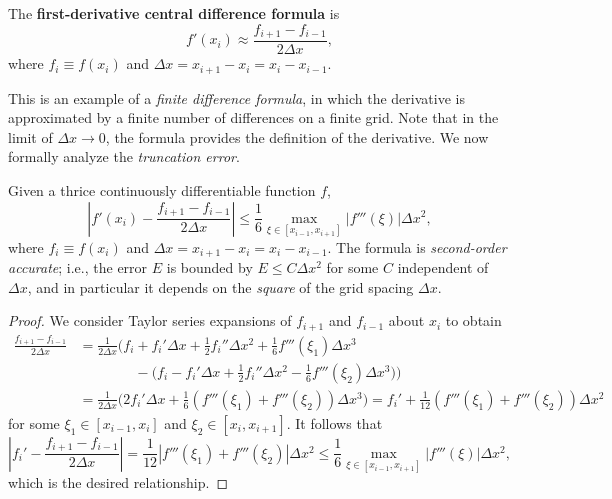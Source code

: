 \begin{definition}
    The \textbf{first-derivative central difference formula} is
    \begin{equation*}
        f'(x_i) \approx \frac{f_{i+1} - f_{i-1}}{2\Delta x}, \tag{8.1}
    \end{equation*}
    where $f_i \equiv f(x_i)$ and $\Delta x = x_{i+1} - x_i = x_i - x_{i-1}$.
\end{definition}

This is an example of a \textit{finite difference formula}, in which the derivative is approximated by a finite number of differences on a finite grid. Note that in the limit of $\Delta x \to 0$, the formula provides the definition of the derivative. We now formally analyze the \textit{truncation error}.

\begin{proposition}[][8.2]
    Given a thrice continuously differentiable function $f$,
    \[\left|f'(x_i) - \frac{f_{i+1} - f_{i-1}}{2\Delta x}\right| \leq \frac{1}{6} \max_{\xi \in [x_{i-1}, x_{i+1}]} |f'''(\xi)| \Delta x^2,\]
    where $f_i \equiv f(x_i)$ and $\Delta x = x_{i+1} - x_i = x_i - x_{i-1}$. The formula is \textit{second-order accurate}; i.e., the error $E$ is bounded by $E \leq C\Delta x^2$ for some $C$ independent of $\Delta x$, and in particular it depends on the \textit{square} of the grid spacing $\Delta x$.
\end{proposition}
\begin{proof}
    We consider Taylor series expansions of $f_{i+1}$ and $f_{i-1}$ about $x_i$ to obtain
    \begin{align*}
        \frac{f_{i+1} - f_{i-1}}{2\Delta x} &= \frac{1}{2\Delta x} \Big(f_i + f_i'\Delta x + \frac{1}{2} f_i''\Delta x^2 + \frac{1}{6} f'''(\xi_1)\Delta x^3 \\
        &\qquad\qquad - \big(f_i - f_i'\Delta x + \frac{1}{2} f_i''\Delta x^2 - \frac{1}{6} f'''(\xi_2)\Delta x^3\big)\Big) \\
        &= \frac{1}{2\Delta x} \Big(2f_i'\Delta x + \frac{1}{6}(f'''(\xi_1) + f'''(\xi_2))\Delta x^3\Big) = f_i' + \frac{1}{12}(f'''(\xi_1) + f'''(\xi_2))\Delta x^2
    \end{align*}
    for some $\xi_1 \in [x_{i-1}, x_i]$ and $\xi_2 \in [x_i, x_{i+1}]$. It follows that
    \[\left|f_i' - \frac{f_{i+1} - f_{i-1}}{2\Delta x}\right| = \frac{1}{12} |f'''(\xi_1) + f'''(\xi_2)| \Delta x^2 \leq \frac{1}{6} \max_{\xi \in [x_{i-1}, x_{i+1}]} |f'''(\xi)| \Delta x^2,\]
    which is the desired relationship.
\end{proof}

